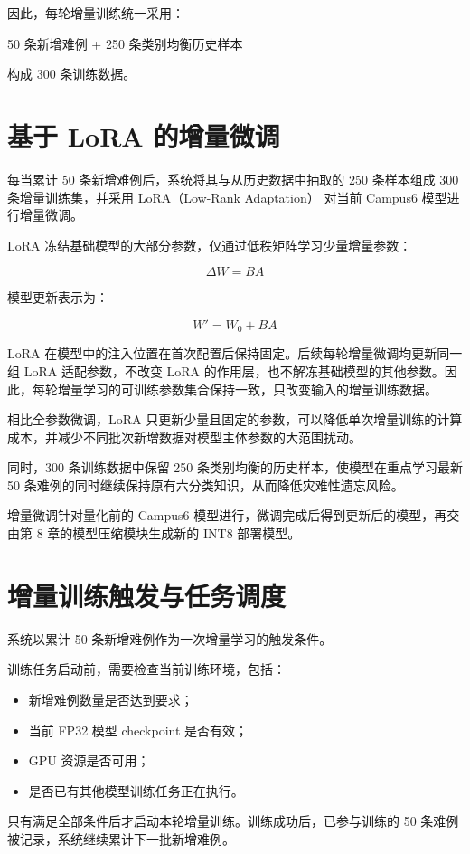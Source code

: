 因此，每轮增量训练统一采用：

50 条新增难例 + 250 条类别均衡历史样本

构成 300 条训练数据。

\section{基于 LoRA 的增量微调}

每当累计 50 条新增难例后，系统将其与从历史数据中抽取的 250 条样本组成 300 条增量训练集，并采用 LoRA（Low-Rank Adaptation） 对当前 Campus6 模型进行增量微调。

LoRA 冻结基础模型的大部分参数，仅通过低秩矩阵学习少量增量参数：

\[
\Delta W=BA
\]

模型更新表示为：

\[
W'=W_0+BA
\]

LoRA 在模型中的注入位置在首次配置后保持固定。后续每轮增量微调均更新同一组 LoRA 适配参数，不改变 LoRA 的作用层，也不解冻基础模型的其他参数。因此，每轮增量学习的可训练参数集合保持一致，只改变输入的增量训练数据。

相比全参数微调，LoRA 只更新少量且固定的参数，可以降低单次增量训练的计算成本，并减少不同批次新增数据对模型主体参数的大范围扰动。

同时，300 条训练数据中保留 250 条类别均衡的历史样本，使模型在重点学习最新 50 条难例的同时继续保持原有六分类知识，从而降低灾难性遗忘风险。

增量微调针对量化前的 Campus6 模型进行，微调完成后得到更新后的模型，再交由第 8 章的模型压缩模块生成新的 INT8 部署模型。

\section{增量训练触发与任务调度}

系统以累计 50 条新增难例作为一次增量学习的触发条件。

训练任务启动前，需要检查当前训练环境，包括：

\begin{itemize}
\item 新增难例数量是否达到要求；
\item 当前 FP32 模型 checkpoint 是否有效；
\item GPU 资源是否可用；
\item 是否已有其他模型训练任务正在执行。
\end{itemize}

只有满足全部条件后才启动本轮增量训练。训练成功后，已参与训练的 50 条难例被记录，系统继续累计下一批新增难例。

